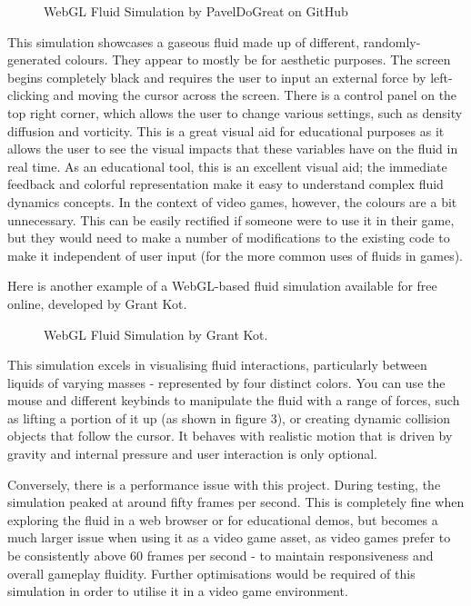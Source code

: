 \documentclass[12pt]{article}
\newcommand{\wideimage}[2][]{%
  \makebox[\textwidth][c]{\texttt{[image: \#2]}}%
}
\begin{document}
    \begin{figure}[H]
        \noindent\wideimage[]{webGLGas.png}
        \caption{WebGL Fluid Simulation by PavelDoGreat on GitHub \cite{webgl1}}
    \end{figure}

    This simulation showcases a gaseous fluid made up of different, randomly-generated colours. They appear to mostly be for aesthetic purposes. The screen begins completely black and requires the user to input an external force by left-clicking and moving the cursor across the screen. There is a control panel on the top right corner, which allows the user to change various settings, such as density diffusion and vorticity. This is a great visual aid for educational purposes as it allows the user to see the visual impacts that these variables have on the fluid in real time. As an educational tool, this is an excellent visual aid; the immediate feedback and colorful representation make it easy to understand complex fluid dynamics concepts. In the context of video games, however, the colours are a bit unnecessary. This can be easily rectified if someone were to use it in their game, but they would need to make a number of modifications to the existing code to make it independent of user input (for the more common uses of fluids in games).

    Here is another example of a WebGL-based fluid simulation available for free online, developed by Grant Kot.

    \begin{figure}[H]
        \noindent\wideimage[]{webGLParticles.png}
        \caption{WebGL Fluid Simulation by Grant Kot. \cite{webgl2}}
    \end{figure}
    
    This simulation excels in visualising fluid interactions, particularly between liquids of varying masses - represented by four distinct colors. You can use the mouse and different keybinds to manipulate the fluid with a range of forces, such as lifting a portion of it up (as shown in figure 3), or creating dynamic collision objects that follow the cursor. It behaves with realistic motion that is driven by gravity and internal pressure and user interaction is only optional.

    Conversely, there is a performance issue with this project. During testing, the simulation peaked at around fifty frames per second. This is completely fine when exploring the fluid in a web browser or for educational demos, but becomes a much larger issue when using it as a video game asset, as video games prefer to be consistently above 60 frames per second - to maintain responsiveness and overall gameplay fluidity. Further optimisations would be required of this simulation in order to utilise it in a video game environment.
\end{document}
